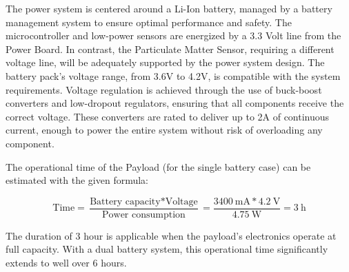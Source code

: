 The power system is centered around a Li-Ion battery, managed by a battery management system to ensure optimal performance and safety. The microcontroller and low-power sensors are energized by a 3.3 Volt line from the Power Board. In contrast, the Particulate Matter Sensor, requiring a different voltage line, will be adequately supported by the power system design. The battery pack's voltage range, from 3.6V to 4.2V, is compatible with the system requirements. Voltage regulation is achieved through the use of buck-boost converters and low-dropout regulators, ensuring that all components receive the correct voltage. These converters are rated to deliver up to 2A of continuous current, enough to power the entire system without risk of overloading any component.

The operational time of the Payload (for the single battery case) can be estimated with the given formula:

\begin{equation*}
\text{Time} = \frac{\text{Battery capacity} * \text{Voltage}}{\text{Power consumption}}=\frac{\SI{3400}{\milli\ampere} * \SI{4.2}{\volt}}{\SI{4.75}{\watt}} = \SI{3}{\hour}
\end{equation*}

The duration of 3 hour is applicable when the payload's electronics operate at full capacity. With a dual battery system, this operational time significantly extends to well over 6 hours.

